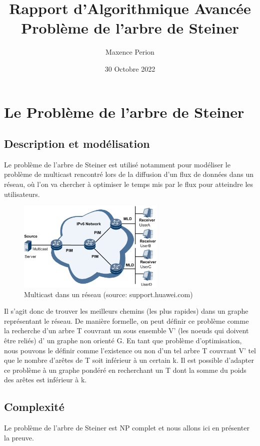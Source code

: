 \documentclass{article}
\title{Rapport d'Algorithmique Avancée \\ Problème de l'arbre de Steiner}
\author{Maxence Perion}
\date{30 Octobre 2022}
\begin{document}
\maketitle 


\tableofcontents
\newpage




\section{Le Problème de l'arbre de Steiner}
\subsection{Description et modélisation}
Le problème de l'arbre de Steiner est utilisé notamment pour modéliser le problème de multicast rencontré lors de la diffusion d'un flux de données dans un réseau, où l'on va chercher à optimiser le temps mis par le flux pour atteindre les utilisateurs. \\ \par
\begin{figure}[!h]
	\centerline{ \includegraphics[width=7cm]{images/multicast.png}}
	\caption{Multicast dans un réseau (source: support.huawei.com)}
\end{figure}
Il s'agit donc de trouver les meilleurs chemins (les plus rapides) dans un graphe représentant le réseau. De manière formelle, on peut définir ce problème comme la recherche d'un arbre T couvrant un sous ensemble V' (les noeuds qui doivent être reliés) d' un graphe non orienté G. En tant que problème d'optimisation, nous pouvons le définir comme l'existence ou non d'un tel arbre T couvrant V' tel que le nombre d'arêtes de T soit inférieur à un certain k. Il est possible d'adapter ce problème à un graphe pondéré en recherchant un T dont la somme du poids des arêtes est inférieur à k.

\subsection{Complexité}
Le problème de l'arbre de Steiner est NP complet et nous allons ici en présenter la preuve. 
\end{document}
